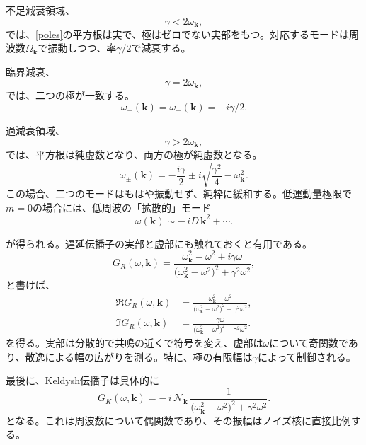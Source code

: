 \documentclass[a4paper,11pt,oneside]{article}
\theoremstyle{definition}
\numberwithin{equation}{section}
\begin{document}
不足減衰領域、
\begin{equation}
\gamma<2\omega_{\mathbf k},
\end{equation}
では、\eqref{poles}の平方根は実で、極はゼロでない実部をもつ。対応するモードは周波数\(\Omega_{\mathbf k}\)で振動しつつ、率\(\gamma/2\)で減衰する。



臨界減衰、
\begin{equation}
\gamma=2\omega_{\mathbf k},
\end{equation}
では、二つの極が一致する。
\begin{equation}
\omega_+(\mathbf k)=\omega_-(\mathbf k)=-i\gamma/2 .
\end{equation}


過減衰領域、
\begin{equation}
\gamma>2\omega_{\mathbf k},
\end{equation}
では、平方根は純虚数となり、両方の極が純虚数となる。
\begin{equation}
\omega_\pm(\mathbf k)
=
-\frac{i\gamma}{2}
\pm
i\sqrt{\frac{\gamma^2}{4}-\omega_{\mathbf k}^2} .
\end{equation}
この場合、二つのモードはもはや振動せず、純粋に緩和する。低運動量極限で$  m=0 $の場合には、低周波の「拡散的」モード
\begin{equation}
\omega(\mathbf k)\sim -\,iD\,\mathbf k^2+\cdots .
\end{equation}


が得られる。遅延伝播子の実部と虚部にも触れておくと有用である。
\begin{equation}
G_R(\omega,\mathbf k)
=
\frac{\omega_{\mathbf k}^2-\omega^2+i\gamma\omega}
{\bigl(\omega_{\mathbf k}^2-\omega^2\bigr)^2+\gamma^2\omega^2} ,
\end{equation}
と書けば、
\begin{align}
\Re G_R(\omega,\mathbf k)
&=
\frac{\omega_{\mathbf k}^2-\omega^2}
{\bigl(\omega_{\mathbf k}^2-\omega^2\bigr)^2+\gamma^2\omega^2} ,
\\
\Im G_R(\omega,\mathbf k)
&=
\frac{\gamma\omega}
{\bigl(\omega_{\mathbf k}^2-\omega^2\bigr)^2+\gamma^2\omega^2} .
\end{align}
を得る。実部は分散的で共鳴の近くで符号を変え、虚部は\(\omega\)について奇関数であり、散逸による幅の広がりを測る。特に、極の有限幅は\(\gamma\)によって制御される。



最後に、Keldysh伝播子は具体的に
\begin{equation}
G_K(\omega,\mathbf k)
=
-\,i\,\mathcal N_{\mathbf k}\,
\frac{1}
{\bigl(\omega_{\mathbf k}^2-\omega^2\bigr)^2+\gamma^2\omega^2} .
\end{equation}
となる。これは周波数について偶関数であり、その振幅はノイズ核に直接比例する。
\end{document}
